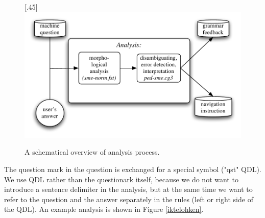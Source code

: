 \documentclass[11pt]{article}
\begin{document}
\begin{figure}[htbp]
\begin{center}
\scalebox{.45}[.45]{\includegraphics{presentation/img/qa2.pdf}}
\caption{A schematical overview of analysis process.}
\label{qasystem}
\end{center}
\end{figure}

The question mark in the question is exchanged for a special symbol ("qst" QDL). We use QDL rather than the questionark itself, because we do not want to introduce a sentence delimiter in the analysis, but at the same time we want to refer to the question and the answer separately in the rules (left or right side of the QDL). An example analysis is shown in Figure \ref{iktelohken}.
\end{document}

